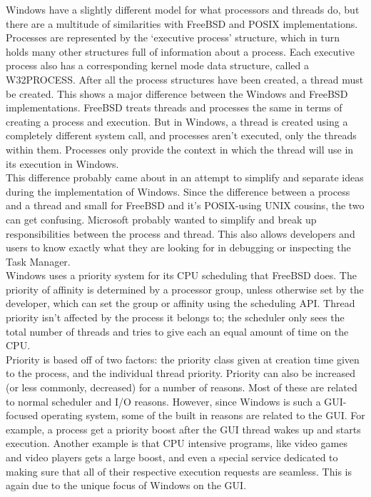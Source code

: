 \documentclass[titlepage]{article}
\begin{document}
\begin{singlespace}
    Windows have a slightly different model for what processors and threads do, but there are a multitude of similarities with FreeBSD and POSIX implementations. \\
    Processes are represented by the ‘executive process’ structure, which in turn holds many other structures full of information about a process. Each executive process also has a corresponding kernel mode data structure, called a W32PROCESS. After all the process structures have been created, a thread must be created. This shows a major difference between the Windows and FreeBSD implementations. FreeBSD treats threads and processes the same in terms of creating a process and execution. But in Windows, a thread is created using a completely different system call, and processes aren’t executed, only the threads within them. Processes only provide the context in which the thread will use in its execution in Windows.\\
    This difference probably came about in an attempt to simplify and separate ideas during the implementation of Windows. Since the difference between a process and a thread and small for FreeBSD and it’s POSIX-using UNIX cousins, the two can get confusing. Microsoft probably wanted to simplify and break up responsibilities between the process and thread. This also allows developers and users to know exactly what they are looking for in debugging or inspecting the Task Manager.\\
    Windows uses a priority system for its CPU scheduling that FreeBSD does. The priority of affinity is determined by a processor group, unless otherwise set by the developer, which can set the group or affinity using the scheduling API. Thread priority isn’t affected by the process it belongs to; the scheduler only sees the total number of threads and tries to give each an equal amount of time on the CPU. \cite{windowsch5}\\
    Priority is based off of two factors: the priority class given at creation time given to the process, and the individual thread priority. Priority can also be increased (or less commonly, decreased) for a number of reasons. Most of these are related to normal scheduler and I/O reasons. However, since Windows is such a GUI-focused operating system, some of the built in reasons are related to the GUI. For example, a process get a priority boost after the GUI thread wakes up and starts execution. Another example is that CPU intensive programs, like video games and video players gets a large boost, and even a special service dedicated to making sure that all of their respective execution requests are seamless. This is again due to the unique focus of Windows on the GUI. \\

\end{singlespace}
\end{document}
